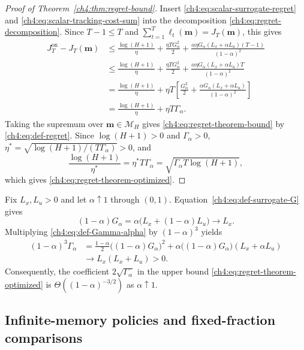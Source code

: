 \begin{proof}[Proof of Theorem~\ref{ch4:thm:regret-bound}]
Insert \eqref{ch4:eq:scalar-surrogate-regret} and
\eqref{ch4:eq:scalar-tracking-cost-sum} into the decomposition
\eqref{ch4:eq:regret-decomposition}. Since $T-1\le T$ and
$\sum_{t=1}^T\ell_t(\mathbf m)=J_T(\mathbf m)$, this gives
\[
\begin{aligned}
J_T^{\mathrm{on}}-J_T(\mathbf m)
&\le\frac{\log(H+1)}{\eta}+\frac{\eta TG_\alpha^2}{2}
 +\frac{\alpha\eta G_\alpha(L_x+\alpha L_u)(T-1)}{(1-\alpha)^2}\\
&\le\frac{\log(H+1)}{\eta}+\frac{\eta TG_\alpha^2}{2}
 +\frac{\alpha\eta G_\alpha(L_x+\alpha L_u)T}{(1-\alpha)^2}\\
&=\frac{\log(H+1)}{\eta}
 +\eta T\left[\frac{G_\alpha^2}{2}
       +\frac{\alpha G_\alpha(L_x+\alpha L_u)}{(1-\alpha)^2}\right]\\
&=\frac{\log(H+1)}{\eta}+\eta T\Gamma_\alpha.
\end{aligned}
\]
Taking the supremum over $\mathbf m\in\mathcal M_H$ gives
\eqref{ch4:eq:regret-theorem-bound} by \eqref{ch4:eq:def-regret}.
Since $\log(H+1)>0$ and $\Gamma_\alpha>0$,
$\eta^*=\sqrt{\log(H+1)/(T\Gamma_\alpha)}>0$, and
\[
\frac{\log(H+1)}{\eta^*}
=\eta^*T\Gamma_\alpha
=\sqrt{\Gamma_\alpha T\log(H+1)},
\]
which gives \eqref{ch4:eq:regret-theorem-optimized}.
\end{proof}

\begin{Thm:Remark}
\label{ch4:rem:retention-dependence}
Fix $L_x,L_u>0$ and let $\alpha\uparrow1$ through $(0,1)$.
Equation~\eqref{ch4:eq:def-surrogate-G} gives
\[
(1-\alpha)G_\alpha
=\alpha\bigl(L_x+(1-\alpha)L_u\bigr)\longrightarrow L_x.
\]
Multiplying \eqref{ch4:eq:def-Gamma-alpha} by $(1-\alpha)^3$ yields
\[
\begin{aligned}
(1-\alpha)^3\Gamma_\alpha
&=\frac{1-\alpha}{2}\bigl((1-\alpha)G_\alpha\bigr)^2
  +\alpha\bigl((1-\alpha)G_\alpha\bigr)(L_x+\alpha L_u)\\
&\longrightarrow L_x(L_x+L_u)>0.
\end{aligned}
\]
Consequently, the coefficient $2\sqrt{\Gamma_\alpha}$ in the upper bound
\eqref{ch4:eq:regret-theorem-optimized} is
$\Theta((1-\alpha)^{-3/2})$ as $\alpha\uparrow1$.
\end{Thm:Remark}

\subsection{Infinite-memory policies and fixed-fraction comparisons}
\label{ch4:subsec:infinite-memory-sdac}

